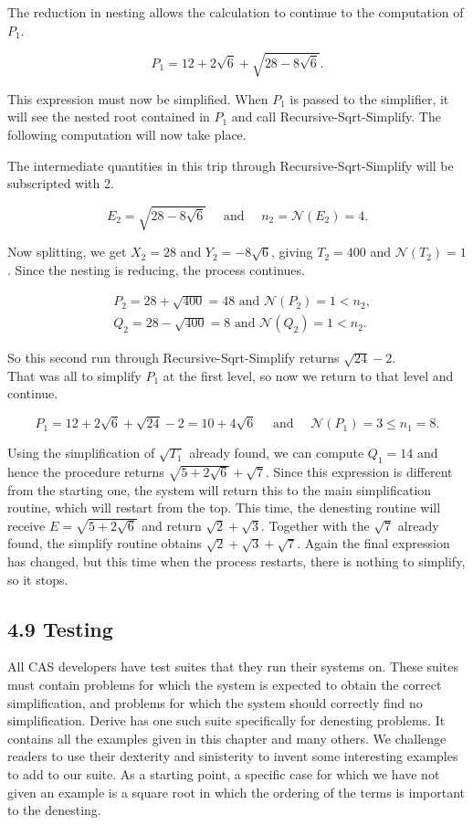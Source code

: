 \documentclass[11pt,letterpaper]{article}
\begin{document}
The reduction in nesting allows the calculation to continue to the computation of $P_{1}$.

\[
P_{1}=12+2 \sqrt{6}+\sqrt{28-8 \sqrt{6}} .
\]

This expression must now be simplified. When $P_{1}$ is passed to the simplifier, it will see the nested root contained in $P_{1}$ and call Recursive-Sqrt-Simplify. The following computation will now take place.

The intermediate quantities in this trip through Recursive-Sqrt-Simplify will be subscripted with 2.

\[
E_{2}=\sqrt{28-8 \sqrt{6}} \quad \text { and } \quad n_{2}=\mathcal{N}\left(E_{2}\right)=4 .
\]

Now splitting, we get $X_{2}=28$ and $Y_{2}=-8 \sqrt{6}$, giving $T_{2}=400$ and $\mathcal{N}\left(T_{2}\right)=1$. Since the nesting is reducing, the process continues.

\[
\begin{aligned}
& P_{2}=28+\sqrt{400}=48 \text { and } \mathcal{N}\left(P_{2}\right)=1<n_{2}, \\
& Q_{2}=28-\sqrt{400}=8 \text { and } \mathcal{N}\left(Q_{2}\right)=1<n_{2} .
\end{aligned}
\]

So this second run through Recursive-Sqrt-Simplify returns $\sqrt{24}-2$.\\
That was all to simplify $P_{1}$ at the first level, so now we return to that level and continue.

\[
P_{1}=12+2 \sqrt{6}+\sqrt{24}-2=10+4 \sqrt{6} \quad \text { and } \quad \mathcal{N}\left(P_{1}\right)=3 \leq n_{1}=8 .
\]

Using the simplification of $\sqrt{T_{1}}$ already found, we can compute $Q_{1}=14$ and hence the procedure returns $\sqrt{5+2 \sqrt{6}}+\sqrt{7}$. Since this expression is different from the starting one, the system will return this to the main simplification routine, which will restart from the top. This time, the denesting routine will receive $E=\sqrt{5+2 \sqrt{6}}$ and return $\sqrt{2}+\sqrt{3}$. Together with the $\sqrt{7}$ already found, the simplify routine obtains $\sqrt{2}+\sqrt{3}+\sqrt{7}$. Again the final expression has changed, but this time when the process restarts, there is nothing to simplify, so it stops.


\subsection*{4.9 Testing}
All CAS developers have test suites that they run their systems on. These suites must contain problems for which the system is expected to obtain the correct simplification, and problems for which the system should correctly find no simplification. Derive has one such suite specifically for denesting problems. It contains all the examples given in this chapter and many others. We challenge readers to use their dexterity and sinisterity to invent some interesting examples to add to our suite. As a starting point, a specific case for which we have not given an example is a square root in which the ordering of the terms is important to the denesting.
\end{document}
